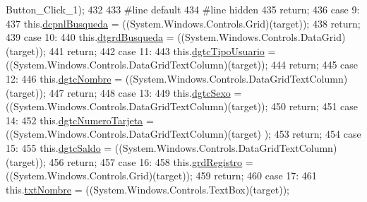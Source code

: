\begin{DoxyCode}
      Button\_Click\_1);
432             
433 \textcolor{preprocessor}{            #line default}
434 \textcolor{preprocessor}{}\textcolor{preprocessor}{            #line hidden}
435 \textcolor{preprocessor}{}            \textcolor{keywordflow}{return};
436             \textcolor{keywordflow}{case} 9:
437             this.\hyperlink{class_proyecto___integrador__3_1_1_main_window_a41eb8f3098c61c6e0dcf936594c033d4}{dcpnlBusqueda} = ((System.Windows.Controls.Grid)(target));
438             \textcolor{keywordflow}{return};
439             \textcolor{keywordflow}{case} 10:
440             this.\hyperlink{class_proyecto___integrador__3_1_1_main_window_aa4ad8e119bd619ccc03b22de048dfe57}{dtgrdBusqueda} = ((System.Windows.Controls.DataGrid)(target));
441             \textcolor{keywordflow}{return};
442             \textcolor{keywordflow}{case} 11:
443             this.\hyperlink{class_proyecto___integrador__3_1_1_main_window_a7760fc254a46e1c3b276f91e25f17a6a}{dgtcTipoUsuario} = ((System.Windows.Controls.DataGridTextColumn)(target));
444             \textcolor{keywordflow}{return};
445             \textcolor{keywordflow}{case} 12:
446             this.\hyperlink{class_proyecto___integrador__3_1_1_main_window_a867d58258d7e2baa1b4d446dda2f2c51}{dgtcNombre} = ((System.Windows.Controls.DataGridTextColumn)(target));
447             \textcolor{keywordflow}{return};
448             \textcolor{keywordflow}{case} 13:
449             this.\hyperlink{class_proyecto___integrador__3_1_1_main_window_a62ea2abb05ef20cbb64ebc690ca3011d}{dgtcSexo} = ((System.Windows.Controls.DataGridTextColumn)(target));
450             \textcolor{keywordflow}{return};
451             \textcolor{keywordflow}{case} 14:
452             this.\hyperlink{class_proyecto___integrador__3_1_1_main_window_ab28b60d43c765aa3cf2dc7c64e56f8c7}{dgtcNumeroTarjeta} = ((System.Windows.Controls.DataGridTextColumn)(target)
      );
453             \textcolor{keywordflow}{return};
454             \textcolor{keywordflow}{case} 15:
455             this.\hyperlink{class_proyecto___integrador__3_1_1_main_window_a4ebf6bc961d2d0fab8efaa8e3ea2879c}{dgtcSaldo} = ((System.Windows.Controls.DataGridTextColumn)(target));
456             \textcolor{keywordflow}{return};
457             \textcolor{keywordflow}{case} 16:
458             this.\hyperlink{class_proyecto___integrador__3_1_1_main_window_a9386928aff943060071efe864b17ca03}{grdRegistro} = ((System.Windows.Controls.Grid)(target));
459             \textcolor{keywordflow}{return};
460             \textcolor{keywordflow}{case} 17:
461             this.\hyperlink{class_proyecto___integrador__3_1_1_main_window_a66650387b40eb348806d9692d163e03a}{txtNombre} = ((System.Windows.Controls.TextBox)(target));

\end{DoxyCode}
